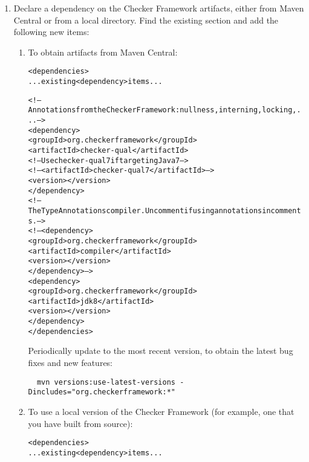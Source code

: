 {\begin{enumerate}
\item Declare a dependency on the Checker Framework artifacts, either from
  Maven Central or from a local directory.  Find the
  existing  section and add the following new
   items:

\begin{enumerate}
\item
  To obtain artifacts from Maven Central:

\begin{alltt}
  <dependencies>
    ... existing <dependency> items ...

    <!-- Annotations from the Checker Framework: nullness, interning, locking, ... -->
    <dependency>
      <groupId>org.checkerframework</groupId>
      <artifactId>checker-qual</artifactId>
       <!-- Use checker-qual7 if targeting Java 7 -->
       <!-- <artifactId>checker-qual7</artifactId> -->
      <version>\ReleaseVersion{}</version>
    </dependency>
    <!-- The Type Annotations compiler. Uncomment if using annotations in comments. -->
    <!-- <dependency>
      <groupId>org.checkerframework</groupId>
      <artifactId>compiler</artifactId>
      <version>\ReleaseVersion{}</version>
    </dependency> -->
    <dependency>
      <groupId>org.checkerframework</groupId>
      <artifactId>jdk8</artifactId>
      <version>\ReleaseVersion{}</version>
    </dependency>
  </dependencies>
\end{alltt}

Periodically update to the most recent version, to obtain the
latest bug fixes and new features:
\begin{Verbatim}
  mvn versions:use-latest-versions -Dincludes="org.checkerframework:*"
\end{Verbatim}

\item
  To use a local version of the Checker Framework (for example,
  one that you have built from source):

\begin{alltt}
  <dependencies>
    ... existing <dependency> items ...


\end{alltt}
\end{enumerate}
\end{enumerate}}
